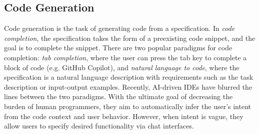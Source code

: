 




\subsection{Code Generation}

Code generation is the task of generating code from a specification. In \textit{code completion}, the specification takes the form of a preexisting code snippet, and the goal is to complete the snippet. There are two popular paradigms for code completion: \textit{tab completion}, where the user can press the tab key to complete a block of code (e.g. GitHub Copilot), and \textit{natural language to code}, where the specification is a natural language description with requirements such as the task description or input-output examples. Recently, AI-driven IDEs have blurred the lines between the two paradigms. With the ultimate goal of decreasing the burden of human programmers, they aim to automatically infer the user's intent from the code context and user behavior. However, when intent is vague, they allow users to specify desired functionality via chat interfaces.


